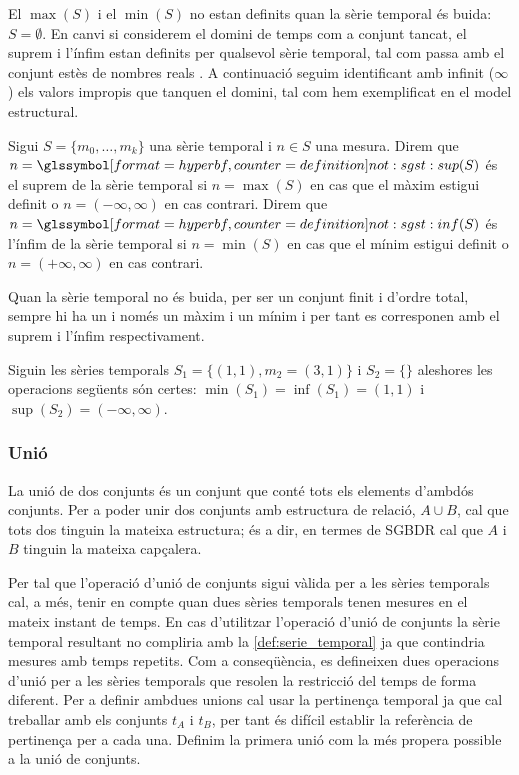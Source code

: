 El $\max(S)$ i el $\min(S)$ no estan definits quan la sèrie temporal
és buida: $S= \emptyset$. En canvi si considerem el domini de temps
com a conjunt tancat, el suprem i l'ínfim estan definits per qualsevol
sèrie temporal, tal com passa amb el conjunt estès de nombres reals
\cite{cantrell:extendedreal}. A continuació seguim identificant amb
infinit ($\infty$) els valors impropis que tanquen el domini, tal com
hem exemplificat en el model estructural.
\begin{definition}\label{def:sgst:sup}\label{def:sgst:inf}
  Sigui $S=\{m_0,\ldots,m_k\}$ una sèrie temporal i $n\in S$ una
  mesura.  Direm que $n=\glssymboldef{not:sgst:sup}(S)$ és el suprem
  de la sèrie temporal si $n=\max(S)$ en cas que el màxim estigui
  definit o $n=(-\infty,\infty)$ en cas contrari.  Direm que
  $n=\glssymboldef{not:sgst:inf}(S)$ és l'ínfim de la sèrie temporal
  si $n=\min(S)$ en cas que el mínim estigui definit o
  $n=(+\infty,\infty)$ en cas contrari.
\end{definition}

Quan la sèrie temporal no és buida, per
ser un conjunt finit i d'ordre total, sempre hi ha un i només un màxim
i un mínim i per tant es corresponen amb el suprem i l'ínfim
respectivament.


\begin{example}
  Siguin les sèries temporals $S_1=\{(1,1),m_2=(3,1)\}$ i $S_2=\{\}$
  aleshores les operacions següents són certes:
  $\min(S_1)=\inf(S_1)=(1,1)$ i $\sup(S_2)=(-\infty,\infty)$.
\end{example}





\subsubsection{Unió}


La unió de dos conjunts és un conjunt que conté tots els elements
d'ambdós conjunts.  Per a poder unir dos conjunts amb estructura de
relació, $A \cup B$, cal que tots dos tinguin la mateixa estructura;
és a dir, en termes de \gls{SGBDR} cal que $A$ i $B$ tinguin la
mateixa capçalera.

Per tal que l'operació d'unió de conjunts sigui vàlida per a les
sèries temporals cal, a més, tenir en compte quan dues sèries
temporals tenen mesures en el mateix instant de temps. En cas
d'utilitzar l'operació d'unió de conjunts la sèrie temporal resultant
no compliria amb la \autoref{def:serie_temporal} ja que contindria
mesures amb temps repetits. Com a conseqüència, es defineixen dues
operacions d'unió per a les sèries temporals que resolen la restricció
del temps de forma diferent.  Per a definir ambdues unions cal usar la
pertinença temporal ja que cal treballar amb els conjunts $t_A$ i
$t_B$, per tant és difícil establir la referència de pertinença per a
cada una.  Definim la primera unió com la més propera possible a la
unió de conjunts.



